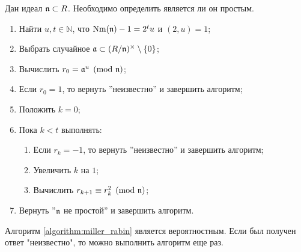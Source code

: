 \documentclass[_00_dissertation.tex]{subfiles}
\begin{document}
\begin{algorithm}\label{algorithm:miller_rabin}
    Дан идеал $\mathfrak{n} \subset R$.
    Необходимо определить является ли он простым.

    \begin{enumerate}
        \item Найти $u, t \in \mathbb{N}$, что $\textrm{Nm}(\mathfrak{n}) - 1 = 2^t u$ и $(2, u) = 1$;
        
        \item Выбрать случайное $\mathfrak{a} \subset (R/\mathfrak{n})^{\times}\setminus\{0\}$;

        \item Вычислить $r_0 = \mathfrak{a}^u \pmod{\mathfrak{n}}$;

        \item Если $r_0 = 1$, то вернуть ''неизвестно'' и завершить алгоритм;

        \item Положить $k = 0$;

        \item Пока $k < t$ выполнять:
        \begin{enumerate}
            \item Если $r_k = -1$, то вернуть ''неизвестно'' и завершить алгоритм;

            \item Увеличить $k$ на $1$;

            \item Вычислить $r_{k+1} \equiv r_k^2 \pmod{\mathfrak{n}}$;
        \end{enumerate}

        \item Вернуть ''$\mathfrak{n}$ не простой'' и завершить алгоритм.
    \end{enumerate}
\end{algorithm}

\begin{remark}
    Алгоритм \ref{algorithm:miller_rabin} является вероятностным.
    Если был получен ответ "неизвестно", то можно выполнить алгоритм еще раз.
\end{remark}
\end{document}
